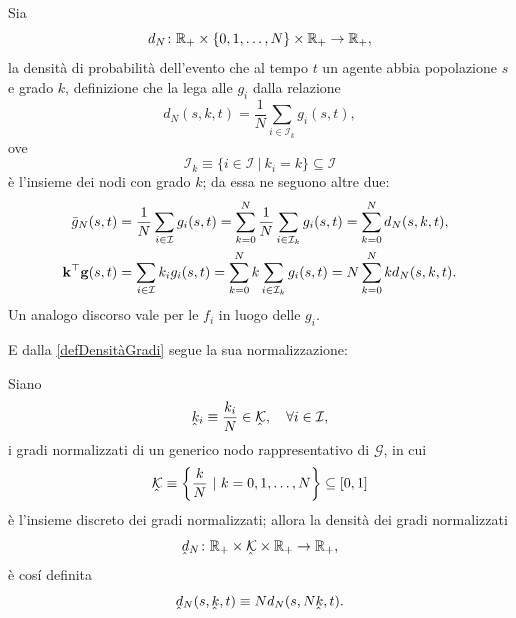             \begin{dfn}
                \label{defDensitàGradi}
                Sia
                \[
                    d_N\colon\mathbb R_+\times\{0,1,\ldots,N\}\times\mathbb R_+\to\mathbb R_+,
                \]
                la densità di probabilità dell'evento che al tempo \(t\) un agente abbia popolazione \(s\) e grado \(k\), definizione che la lega alle \(g_i\) dalla relazione
                \[
                    d_N(s,k,t)=\frac1N\sum_{i\in\mathcal I_k}g_i(s,t),
                \]
                ove
                \begin{equation}
                    \label{eqInsiemeNodiGradok}
                    \mathcal I_k\equiv\{i\in\mathcal I\ |\ k_i=k\}\subseteq\mathcal I
                \end{equation}
                è l'insieme dei nodi con grado \(k\); da essa ne seguono altre due:
                \begin{align}
                    \bar g_N(s,t)
                    &=\frac1N\sum_{i\in\mathcal I}g_i(s,t)
                    =\sum_{k=0}^N\frac1N\sum_{i\in\mathcal I_k}g_i(s,t)
                    =\sum_{k=0}^Nd_N(s,k,t),\label{eqDensitàGradiMarginale}\\
                    \mathbf k^\top\mathbf g(s,t)
                    &=\sum_{i\in\mathcal I}k_ig_i(s,t)
                    =\sum_{k=0}^Nk\sum_{i\in\mathcal I_k}g_i(s,t)
                    =N\sum_{k=0}^Nkd_N(s,k,t).\notag
                \end{align}
                Un analogo discorso vale per le \(f_i\) in luogo delle \(g_i\).
            \end{dfn}

            E dalla \cref{defDensitàGradi} segue la sua normalizzazione:

            \begin{dfn}
                \label{defDensitàGradiNormalizzata}
                Siano
                \[
                    \underhat k_i\equiv\frac{k_i}N\in\underhat{\mathcal K},\quad\forall i\in\mathcal I,
                \]
                i gradi normalizzati di un generico nodo rappresentativo di \(\mathcal G\), in cui
                \[
                    \underhat{\mathcal K}\equiv\left\{\frac kN\ |\ k=0,1,\ldots,N\right\}\subseteq[0,1]
                \]
                è l'insieme discreto dei gradi normalizzati; allora la densità dei gradi normalizzati
                \[
                    \underhat d_N\colon\RPlus\times\underhat{\mathcal K}\times\RPlus\to\RPlus,
                \]
                è cosí definita
                \begin{equation}
                    \label{eqDensitàGradiNormalizzati}
                    \underhat d_N(s,\underhat k,t)\equiv Nd_N(s,N\underhat k,t).
                \end{equation}
            \end{dfn}

